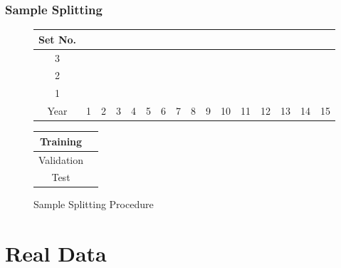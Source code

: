 \documentclass[]{beamer}
\begin{document}
\begin{frame}
\frametitle{Sample Splitting}
\begin{figure}
	\begin{center}
		\begin{tabular}{|c|p{0.25cm}p{0.25cm}p{0.25cm}p{0.25cm}p{0.25cm}p{0.25cm}p{0.25cm}p{0.25cm}p{0.25cm}p{0.25cm}p{0.25cm}p{0.25cm}|p{0.25cm}p{0.25cm}p{0.25cm}|}
			\hline
			Set No. &&&&&&&&&&&&&&& \\
			\hline
			3 & \cellcolor{cyan} & \cellcolor{cyan} & \cellcolor{cyan} & \cellcolor{cyan} & \cellcolor{cyan} & \cellcolor{cyan} & \cellcolor{cyan} & \cellcolor{cyan} & \cellcolor{cyan} & \cellcolor{cyan} & \cellcolor{cyan} &
			\cellcolor{pink} & 
			\cellcolor{olive} & \cellcolor{olive} &	\cellcolor{olive} \\
			2 & \cellcolor{cyan} & \cellcolor{cyan} & \cellcolor{cyan} & \cellcolor{cyan} & \cellcolor{cyan} & \cellcolor{cyan} & \cellcolor{cyan} & \cellcolor{cyan} & \cellcolor{cyan} & \cellcolor{cyan} &
			\cellcolor{pink} & 
			\cellcolor{olive} & \cellcolor{olive} &	\cellcolor{olive} & \cellcolor{olive} \\
			1 & \cellcolor{cyan} & \cellcolor{cyan} & \cellcolor{cyan} & \cellcolor{cyan} & \cellcolor{cyan} & \cellcolor{cyan} & \cellcolor{cyan} & \cellcolor{cyan} & \cellcolor{cyan} &
			\cellcolor{pink} & 
			\cellcolor{olive} & \cellcolor{olive} &	\cellcolor{olive} & \cellcolor{olive} & \cellcolor{olive} \\
			\hline
			Year & 1 & 2 & 3 & 4 & 5 & 6 & 7 & 8 & 9 & 10 & 11 & 12 & 13 & 14 & 15\\
			\hline
		\end{tabular}
		\medskip
		\begin{tabular}{|c|p{0.25cm}|}
			\hline
			Training & \cellcolor{cyan} \\
			\hline
			Validation & \cellcolor{pink} \\
			\hline
			Test & \cellcolor{olive} \\
			\hline
		\end{tabular}
	\end{center}
	\caption{Sample Splitting Procedure}
\end{figure}
\end{frame}

\section{Real Data}
\end{document}
